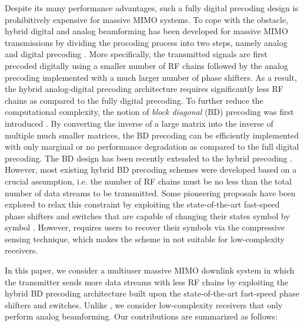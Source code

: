 \documentclass[conference]{IEEEtran}
\begin{document}
Despite its many performance advantages, such a fully digital precoding design is prohibitively expensive for massive MIMO systems. To cope with the obstacle, hybrid digital and analog beamforming has been developed for massive MIMO transmissions by dividing the procoding process into two steps, namely analog and digital precoding \cite{han2015large, el2014spatially}. More specifically, the transmitted signals are first precoded digitally using a smaller number of RF chains followed by the analog precoding implemented with a much larger number of phase shifters. As a result, the hybrid analog-digital precoding architecture requires significantly less RF chains as compared to the fully digital precoding. To further reduce the computational complexity, the notion of \textit{block diagonal} (BD) precoding was first introduced \cite{spencer2004zero}. By converting the inverse of a large matrix into the inverse of  multiple much smaller matrices, the BD precoding can be efficiently implemented with only marginal or no performance degradation as compared to the full digital precoding\cite{spencer2004zero}. The BD design has been recently extended to the hybrid precoding \cite{ni2016hybrid, liu2014phase}. However, most existing hybrid BD precoding schemes were developed based on a crucial assumption, i.e. the number of RF chains must be no less than the total number of data streams to be transmitted. Some pioneering proposals have been explored to relax this constraint by exploiting the state-of-the-art fast-speed phase shifters and switches that are capable of changing their states symbol by symbol \cite{garcia2017mimo}. However, \cite{garcia2017mimo} requires users to recover their symbols via the compressive sensing technique, which makes the scheme in \cite{garcia2017mimo} not suitable for low-complexity receivers.

In this paper, we consider a multiuser massive MIMO downlink system in which the transmitter sends more data streams with less RF chains by exploiting the hybrid BD precoding architecture built upon the state-of-the-art fast-speed phase shifters and switches. Unlike \cite{garcia2017mimo}, we consider low-complexity receivers that only perform analog beamforming. Our contributions are summarized as follows:
\end{document}
